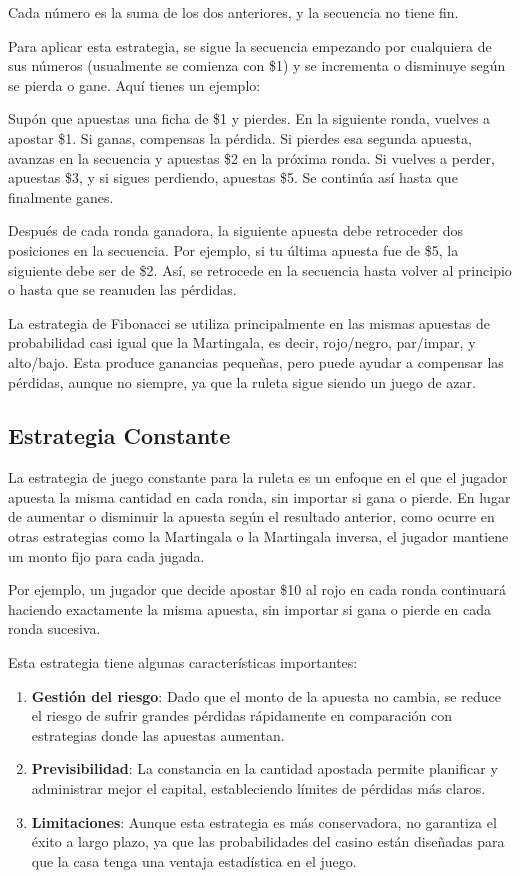 \documentclass{article}
\begin{document}
Cada número es la suma de los dos anteriores, y la secuencia no tiene fin.

Para aplicar esta estrategia, se sigue la secuencia empezando por cualquiera de sus números (usualmente se comienza con \$1) y se incrementa o disminuye según se pierda o gane. Aquí tienes un ejemplo:

Supón que apuestas una ficha de \$1 y pierdes. En la siguiente ronda, vuelves a apostar \$1. Si ganas, compensas la pérdida. Si pierdes esa segunda apuesta, avanzas en la secuencia y apuestas \$2 en la próxima ronda. Si vuelves a perder, apuestas \$3, y si sigues perdiendo, apuestas \$5. Se continúa así hasta que finalmente ganes.

Después de cada ronda ganadora, la siguiente apuesta debe retroceder dos posiciones en la secuencia. Por ejemplo, si tu última apuesta fue de \$5, la siguiente debe ser de \$2. Así, se retrocede en la secuencia hasta volver al principio o hasta que se reanuden las pérdidas.

La estrategia de Fibonacci se utiliza principalmente en las mismas apuestas de probabilidad casi igual que la Martingala, es decir, rojo/negro, par/impar, y alto/bajo. Esta produce ganancias pequeñas, pero puede ayudar a compensar las pérdidas, aunque no siempre, ya que la ruleta sigue siendo un juego de azar.

\subsection{Estrategia Constante}
La estrategia de juego constante para la ruleta es un enfoque en el que el jugador apuesta la misma cantidad en cada ronda, sin importar si gana o pierde. En lugar de aumentar o disminuir la apuesta según el resultado anterior, como ocurre en otras estrategias como la Martingala o la Martingala inversa, el jugador mantiene un monto fijo para cada jugada.

Por ejemplo, un jugador que decide apostar \$10 al rojo en cada ronda continuará haciendo exactamente la misma apuesta, sin importar si gana o pierde en cada ronda sucesiva.

Esta estrategia tiene algunas características importantes:

\begin{enumerate}
\item \textbf{Gestión del riesgo}: Dado que el monto de la apuesta no cambia, se reduce el riesgo de sufrir grandes pérdidas rápidamente en comparación con estrategias donde las apuestas aumentan.
\item \textbf{Previsibilidad}: La constancia en la cantidad apostada permite planificar y administrar mejor el capital, estableciendo límites de pérdidas más claros.
\item \textbf{Limitaciones}: Aunque esta estrategia es más conservadora, no garantiza el éxito a largo plazo, ya que las probabilidades del casino están diseñadas para que la casa tenga una ventaja estadística en el juego.
\end{enumerate}
\end{document}
